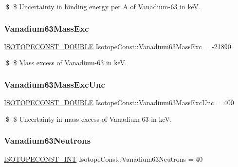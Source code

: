 \$ \$ Uncertainty in binding energy per A of Vanadium-\/63 in keV. \mbox{\label{group___isotope_const-_vanadium-_v63_gafc087b3d2ae3a1648c48931011247140}} 
\subsubsection{\texorpdfstring{Vanadium63\+Mass\+Exc}{Vanadium63MassExc}}
{\footnotesize\ttfamily \mbox{\hyperlink{group___isotope_const-_macros_ga8f45a7272ce02c0b4c65c44636ed719a}{I\+S\+O\+T\+O\+P\+E\+C\+O\+N\+S\+T\+\_\+\+D\+O\+U\+B\+LE}} Isotope\+Const\+::\+Vanadium63\+Mass\+Exc = -\/21890}

\$ \$ Mass excess of Vanadium-\/63 in keV. \mbox{\label{group___isotope_const-_vanadium-_v63_gacfba1455fd52df9d6bf59f246e638e90}} 
\subsubsection{\texorpdfstring{Vanadium63\+Mass\+Exc\+Unc}{Vanadium63MassExcUnc}}
{\footnotesize\ttfamily \mbox{\hyperlink{group___isotope_const-_macros_ga8f45a7272ce02c0b4c65c44636ed719a}{I\+S\+O\+T\+O\+P\+E\+C\+O\+N\+S\+T\+\_\+\+D\+O\+U\+B\+LE}} Isotope\+Const\+::\+Vanadium63\+Mass\+Exc\+Unc = 400}

\$ \$ Uncertainty in mass excess of Vanadium-\/63 in keV. \mbox{\label{group___isotope_const-_vanadium-_v63_gad6383e6da2490b567330e47bd66a38e6}} 
\subsubsection{\texorpdfstring{Vanadium63\+Neutrons}{Vanadium63Neutrons}}
{\footnotesize\ttfamily \mbox{\hyperlink{group___isotope_const-_macros_ga5f18360b3e99483a35c32d789e62621c}{I\+S\+O\+T\+O\+P\+E\+C\+O\+N\+S\+T\+\_\+\+I\+NT}} Isotope\+Const\+::\+Vanadium63\+Neutrons = 40}

